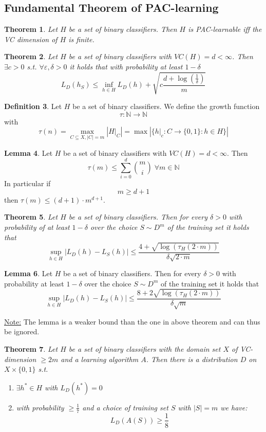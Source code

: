 \documentclass[a4paper, 12pt]{article}
\theoremstyle{plain}
\newtheorem{theorem}{Theorem}[subsection] %
\theoremstyle{definition}
\newtheorem{definition}[theorem]{Definition} %
\theoremstyle{lemma}
\newtheorem{lemma}[theorem]{Lemma}
\theoremstyle{remark}
\theoremstyle{example}
\begin{document}
	\subsection{Fundamental Theorem of PAC-learning}
	\begin{theorem}
		Let $H$ be a set of binary classifiers. Then $H$ is PAC-learnable iff the VC dimension of $H$ is finite.
	\end{theorem}
	\begin{theorem}
		Let $H$ be a set of binary classifiers with $VC(H) = d < \infty$. Then $\exists c > 0$ s.t. $\forall \varepsilon, \delta > 0$ it holds that with probability at least $1-\delta$ \[L_D(h_S) \leq \inf_{h \in H} L_D(h) + \sqrt{c\frac{d+\log(\frac{1}{\delta})}{m}}\]
	\end{theorem}
	\begin{definition}
		Let $H$ be a set of binary classifiers. We define the growth function \[\tau: \mathbb{N} \to \mathbb{N}\] with \[\tau(n) = \max\limits_{C\subseteq X, \left|C\right| = m} \left|H|_C\right| = \max\left|\{h|_c: C \to \{0,1\}: h \in H\}\right|\]
	\end{definition}
	\begin{lemma}
		Let $H$ be a set of binary classifiers with $VC(H) = d < \infty$. Then \[\tau(m) \leq \sum_{i=0}^d \binom{m}{i} \; \forall m \in \mathbb{N}\] In particular if \[m \geq d+1\] then $\tau(m) \leq (d+1)\cdot m^{d+1}$.
	\end{lemma}
	\begin{theorem}
		Let $H$ be a set of binary classifiers. Then for every $\delta >0$ with probability of at least $1-\delta$ over the choice $S\sim D^m$ of the training set it holds that \[\sup_{h \in H} \left|L_D(h) - L_S(h)\right| \leq \frac{4+\sqrt{\log(\tau_H(2\cdot m))}}{\delta\sqrt{2\cdot m}}\] 
	\end{theorem}
	\begin{lemma}
		Let $H$ be a set of binary classifiers. Then for every $\delta > 0$ with probability at least $1-\delta$ over the choice $S\sim D^m$ of the training set it holds that \[\sup_{h \in H} \left|L_D(h) - L_S(h)\right| \leq \frac{8+2\sqrt{\log(\tau_H(2\cdot m))}}{\delta \sqrt{m}}\]
	\end{lemma}
	\underline{Note:} The lemma is a weaker bound than the one in above theorem and can thus be ignored.
	\begin{theorem}
		Let $H$ be a set of binary classifiers with the domain set $X$ of VC-dimension $\geq2m$ and a learning algorithm $A$. Then there is a distribution $D$ on $X\times \{0,1\}$ s.t. \begin{enumerate}
			\item $\exists h^* \in H$ with $L_D(h^*) = 0$
			\item with probability $\geq \frac{1}{7}$ and a choice of training set $S$ with $\left|S\right| = m$ we have: \[L_D(A(S)) \geq \frac{1}{8}\]
		\end{enumerate}
	\end{theorem}
	
\end{document}
